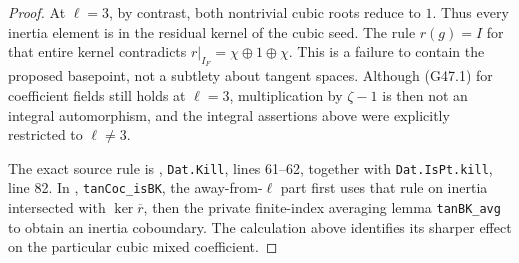 \begin{proof}
At $\ell=3$, by contrast, both nontrivial cubic roots reduce
to $1$.  Thus every inertia element is in the residual kernel
of the cubic seed.  The rule $r(g)=I$ for that entire kernel
contradicts $r|_{I_F}=\chi\oplus1\oplus\chi$.
This is a failure to contain the proposed basepoint, not a
subtlety about tangent spaces.  Although (G47.1) for coefficient
fields still holds at $\ell=3$, multiplication by $\zeta-1$
is then not an integral automorphism, and the integral assertions
above were explicitly restricted to $\ell\ne3$.

The exact source rule is
,
\texttt{Dat.Kill}, lines 61--62, together with
\texttt{Dat.IsPt.kill}, line 82.
In ,
\texttt{tanCoc\_isBK}, the away-from-$\ell$ part first uses
that rule on inertia intersected with $\ker\overline r$,
then the private finite-index averaging lemma
\texttt{tanBK\_avg} to obtain an inertia coboundary.
The calculation above identifies its sharper effect on the
particular cubic mixed coefficient.
\end{proof}

